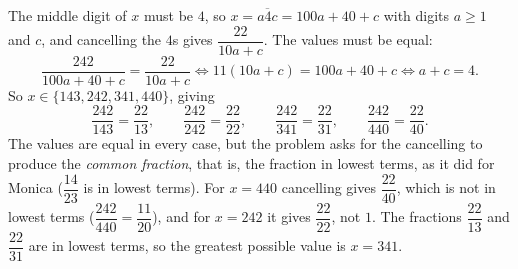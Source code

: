 The middle digit of $x$ must be $4$, so $x=\overline{a4c}=100a+40+c$ with digits $a\ge1$ and $c$, and cancelling the $4$s gives $\dfrac{22}{10a+c}$. The values must be equal:
\[
\dfrac{242}{100a+40+c}=\dfrac{22}{10a+c}\iff 11(10a+c)=100a+40+c\iff a+c=4 .
\]
So $x\in\{143,242,341,440\}$, giving
\[
\dfrac{242}{143}=\dfrac{22}{13},\qquad \dfrac{242}{242}=\dfrac{22}{22},\qquad \dfrac{242}{341}=\dfrac{22}{31},\qquad \dfrac{242}{440}=\dfrac{22}{40}.
\]
The values are equal in every case, but the problem asks for the cancelling to produce the \emph{common fraction}, that is, the fraction in lowest terms, as it did for Monica ($\dfrac{14}{23}$ is in lowest terms). For $x=440$ cancelling gives $\dfrac{22}{40}$, which is not in lowest terms ($\dfrac{242}{440}=\dfrac{11}{20}$), and for $x=242$ it gives $\dfrac{22}{22}$, not $1$. The fractions $\dfrac{22}{13}$ and $\dfrac{22}{31}$ are in lowest terms, so the greatest possible value is $x=\boxed{341}$.
